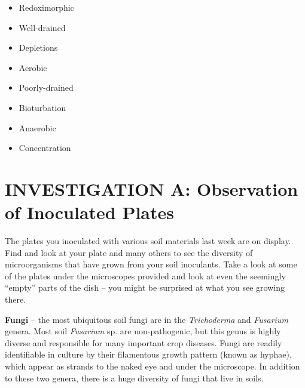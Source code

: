 \documentclass[
  letterpaper,
  twocolumn,
  portrait]{scrbook}
\providecommand{\tightlist}{%
  \setlength{\itemsep}{0pt}\setlength{\parskip}{0pt}}\usepackage{longtable,booktabs,array}
\begin{document}
\begin{tcolorbox}[enhanced jigsaw, colframe=quarto-callout-tip-color-frame, coltitle=black, arc=.35mm, breakable, bottomrule=.15mm, colback=white, rightrule=.15mm, toprule=.15mm, opacityback=0, bottomtitle=1mm, left=2mm, titlerule=0mm, leftrule=.75mm, opacitybacktitle=0.6, toptitle=1mm, title=\textcolor{quarto-callout-tip-color}{\faLightbulb}\hspace{0.5em}{Key Words \& Concepts}, colbacktitle=quarto-callout-tip-color!10!white]

\begin{itemize}
\tightlist
\item
  Redoximorphic
\item
  Well-drained
\item
  Depletions
\item
  Aerobic
\item
  Poorly-drained
\item
  Bioturbation
\item
  Anaerobic
\item
  Concentration
\end{itemize}

\end{tcolorbox}

\hypertarget{investigation-a-observation-of-inoculated-plates}{%
\section{INVESTIGATION A: Observation of Inoculated
Plates}\label{investigation-a-observation-of-inoculated-plates}}

The plates you inoculated with various soil materials last week are on
display. Find and look at your plate and many others to see the
diversity of microorganisms that have grown from your soil inoculants.
Take a look at some of the plates under the microscopes provided and
look at even the seemingly ``empty'' parts of the dish -- you might be
surprised at what you see growing there.

\textbf{Fungi} -- the most ubiquitous soil fungi are in the
\emph{Trichoderma} and \emph{Fusarium} genera. Most soil \emph{Fusarium}
sp. are non-pathogenic, but this genus is highly diverse and responsible
for many important crop diseases. Fungi are readily identifiable in
culture by their filamentous growth pattern (known as hyphae), which
appear as strands to the naked eye and under the microscope. In addition
to these two genera, there is a huge diversity of fungi that live in
soils.
\end{document}
